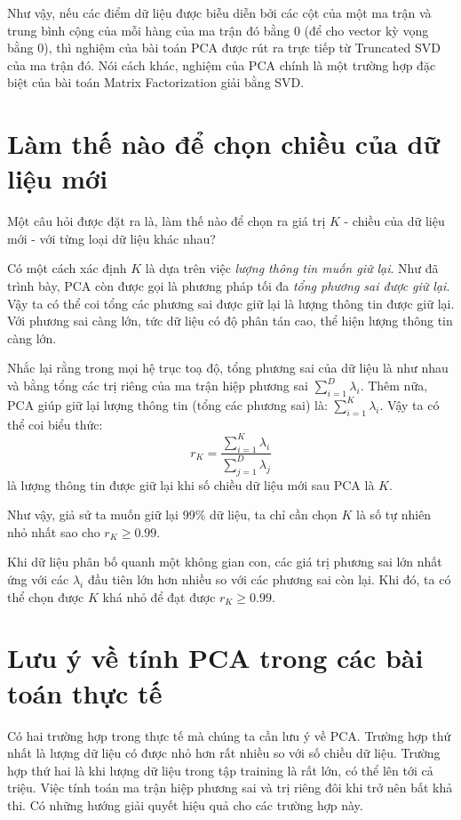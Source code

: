 Như vậy, nếu các điểm dữ liệu được biễu diễn bởi các cột của một ma trận và trung bình cộng của mỗi hàng của ma trận đó bằng 0 (để cho vector kỳ vọng bằng 0), thì nghiệm của bài toán PCA được rút ra trực tiếp từ Truncated SVD của ma trận đó. Nói cách khác, nghiệm của PCA chính là một trường hợp đặc biệt của bài toán Matrix Factorization giải bằng SVD. 
 
 
\section{Làm thế nào để chọn chiều của dữ liệu mới}
 
Một câu hỏi được đặt ra là, làm thế nào để chọn ra giá trị $K$ - chiều của dữ liệu mới - với từng loại dữ liệu khác nhau? 
 
Có một cách xác định $K$ là dựa trên việc \textit{lượng thông tin muốn giữ lại}. Như đã trình bày, PCA còn được gọi là phương pháp tối đa \textit{tổng phương sai được giữ lại}. Vậy ta có thể coi tổng các phương sai được giữ lại là lượng thông tin được giữ lại. Với phương sai càng lớn, tức dữ liệu có độ phân tán cao, thể hiện lượng thông tin càng lớn. 
 
 Nhắc lại rằng trong mọi hệ trục toạ độ, tổng phương sai của dữ liệu là như nhau và bằng tổng các trị riêng của ma trận hiệp phương sai $\sum_{i=1}^D \lambda_i$. Thêm nữa, PCA giúp giữ lại lượng thông tin (tổng các phương sai) là: $\sum_{i=1}^K \lambda_i$. Vậy ta có thể coi biểu thức: 
\begin{equation} 
 \label{eqn:28_6}
   r_K = \frac{\sum_{i=1}^K \lambda_i}{\sum_{j=1}^D \lambda_j} 
\end{equation} 
là lượng thông tin được giữ lại khi số chiều dữ liệu mới sau PCA là $K$. 
 
Như vậy, giả sử ta muốn giữ lại 99\% dữ liệu, ta chỉ cần chọn $K$ là số tự nhiên nhỏ nhất sao cho $r_K \geq 0.99$. 
 
Khi dữ liệu phân bố quanh một không gian con, các giá trị phương sai lớn nhất ứng với các $\lambda_i$ đầu tiên lớn hơn nhiều so với các phương sai còn lại. Khi đó, ta có thể chọn được $K$ khá nhỏ để đạt được $r_K \geq 0.99$. 
 
 
\section{Lưu ý về tính PCA trong các bài toán thực tế}
Có hai trường hợp trong thực tế mà chúng ta cần lưu ý về PCA. Trường hợp thứ nhất là lượng dữ liệu có được nhỏ hơn rất nhiều so với số chiều dữ liệu. Trường hợp thứ hai là khi lượng dữ liệu trong tập training là rất lớn, có thể lên tới cả triệu. Việc tính toán ma trận hiệp phương sai và trị riêng đôi khi trở nên bất khả thi. Có những hướng giải quyết hiệu quả cho các trường hợp này. 
 

